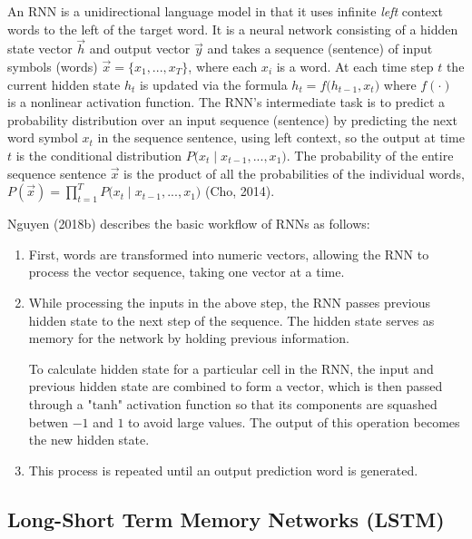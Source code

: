 An RNN is a unidirectional language model in that it uses infinite \emph{left} context words to the left of the target word. It is a neural network consisting of a hidden state vector $\overrightarrow{h}$ and output vector $\overrightarrow{y}$ and takes a sequence (sentence) of input symbols (words) $\overrightarrow{x} = \{ x_1, ..., x_T\}$, where each $x_i$ is a word. At each time step $t$ the current hidden state $h_t$ is updated via the formula $h_t = f \Big( h_{t-1}, x_t \Big)$ where $f(\cdot)$ is a nonlinear activation function. The RNN's intermediate task is to predict a probability distribution over an input sequence (sentence) by predicting the next word symbol $x_t$ in the sequence sentence, using left context, so the output at time $t$ is the conditional distribution $P \Big(x_t \; | \; x_{t-1}, ..., x_1 \Big)$. The probability of the entire sequence sentence $\overrightarrow{x}$ is the product of all the probabilities of the individual words, $P(\overrightarrow{x}) = \prod_{t=1}^T P \Big(x_t \; | \; x_{t-1}, ..., x_1 \Big)$ (Cho, 2014). 

Nguyen (2018b) describes the basic workflow of RNNs as follows: 

\begin{enumerate}
    \item First, words are transformed into numeric vectors, allowing the RNN to process the vector sequence, taking one vector at a time. 
    
    \item While processing the inputs in the above step, the RNN passes previous hidden state to the next step of the sequence. The hidden state serves as memory for the network by holding previous information. 
    
    To calculate hidden state for a particular cell in the RNN, the input and previous hidden state are combined to form a vector, which is then passed through a $\text{"tanh"}$ activation function so that its components are squashed betwen $-1$ and $1$ to avoid large values. The output of this operation becomes the new hidden state. 
    
    \item This process is repeated until an output prediction word is generated. 
    
\end{enumerate}


    
\subsection{Long-Short Term Memory Networks (LSTM)} \label{sec:LSTM}

